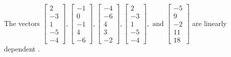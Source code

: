 \begin{exercise}
\begin{exerciseStatement}
  \end{exerciseStatement}
  \begin{exerciseAnswer}
   The vectors \(\left[\begin{array}{r}
2 \\
-3 \\
1 \\
-5 \\
-4
\end{array}\right] , \left[\begin{array}{r}
-1 \\
0 \\
-1 \\
4 \\
-6
\end{array}\right] , \left[\begin{array}{r}
-4 \\
-6 \\
4 \\
3 \\
-2
\end{array}\right] , \left[\begin{array}{r}
2 \\
-3 \\
1 \\
-5 \\
-4
\end{array}\right] , \text{ and } \left[\begin{array}{r}
-5 \\
9 \\
-2 \\
11 \\
18
\end{array}\right]\) are 
  	 linearly dependent  .
  


  \end{exerciseAnswer}
\end{exercise}